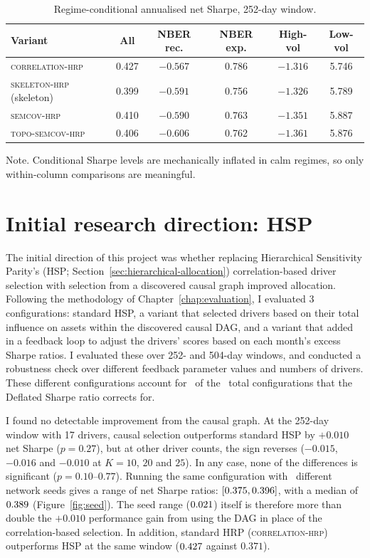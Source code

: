 \documentclass[11pt, a4paper]{report}
\newcommand{\corrhrp}{\textsc{correlation-hrp}}
\newcommand{\skelhrp}{\textsc{skeleton-hrp}}
\newcommand{\semcovhrp}{\textsc{semcov-hrp}}
\newcommand{\toposemcovhrp}{\textsc{topo-semcov-hrp}}
\newcommand{\floatnote}[1]{\par\vspace{3pt}\begin{minipage}{0.92\textwidth}\footnotesize Note. #1\end{minipage}\par}
\begin{document}
\begin{table}[htbp]
  \centering
  \caption{Regime-conditional annualised net Sharpe, 252-day window.}
  \label{tab:regime-full}
  \begin{tabular}{l c c c c c}
    \toprule
    Variant & All & NBER rec. & NBER exp. & High-vol & Low-vol \\
    \midrule
    \corrhrp{}     & 0.427 & $-0.567$ & 0.786 & $-1.316$ & 5.746 \\
    \skelhrp{} (skeleton)     & 0.399 & $-0.591$ & 0.756 & $-1.326$ & 5.789 \\
    \semcovhrp{}                & 0.410 & $-0.590$ & 0.763 & $-1.351$ & 5.887 \\
    \toposemcovhrp{}               & 0.406 & $-0.606$ & 0.762 & $-1.361$ & 5.876 \\
    \bottomrule
  \end{tabular}
  \floatnote{Conditional Sharpe levels are mechanically inflated in calm regimes, so only within-column comparisons are meaningful.}
\end{table}

\FloatBarrier

\section{Initial research direction: HSP}
\label{app:hsp}

The initial direction of this project was whether replacing Hierarchical Sensitivity Parity's (HSP; Section~\ref{sec:hierarchical-allocation}) correlation-based driver selection with selection from a discovered causal graph improved allocation. 
Following the methodology of Chapter~\ref{chap:evaluation}, I evaluated 3 configurations: standard HSP, a
variant that selected drivers based on their total influence on
assets within the discovered causal DAG, and a variant that added in a feedback loop to adjust the drivers' scores based on each month's excess Sharpe ratios.
I evaluated these over 252- and 504-day windows, and conducted a robustness check over different feedback parameter values and numbers of drivers. These different configurations account for \rsNtrialsPhaseI\ of the \rsNtrials\ total configurations that the Deflated Sharpe ratio corrects for.

I found no detectable improvement from the causal graph.
At the 252-day window with 17 drivers, causal selection outperforms standard HSP
by $+0.010$ net Sharpe ($p=0.27$), but at other
driver counts, the sign reverses ($-0.015$, $-0.016$ and $-0.010$ at $K=10$, $20$ and
$25$). In any case, none of the differences is significant ($p=0.10$--$0.77$).
Running the same configuration with \rsSeedN\ different network seeds gives a range of net Sharpe ratios: $[0.375, 0.396]$,
with a median of $0.389$ (Figure~\ref{fig:seed}). 
The seed range ($0.021$) itself is therefore more than double the $+0.010$ performance gain from using the DAG in place of the correlation-based selection. 
In addition, standard HRP (\corrhrp{}) outperforms HSP at the same window ($0.427$ against $0.371$).
\end{document}
